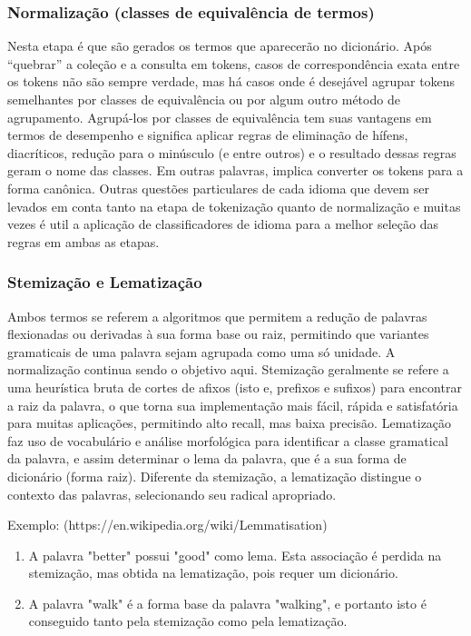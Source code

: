 \subsubsection{Normalização (classes de equivalência de termos)}
Nesta etapa é que são gerados os termos que aparecerão no dicionário.
Após “quebrar” a coleção e a consulta em tokens, casos de correspondência exata entre os tokens não são sempre verdade, mas há casos onde é desejável agrupar tokens semelhantes por classes de equivalência ou por algum outro método de agrupamento. Agrupá-los por classes de equivalência tem suas vantagens em termos de desempenho e significa aplicar regras de eliminação de hífens, diacríticos, redução para o minúsculo (e entre outros) e o resultado dessas regras geram o nome das classes. Em outras palavras, implica converter os tokens para a forma canônica. Outras questões particulares de cada idioma que devem ser levados em conta tanto na etapa de tokenização quanto de normalização e muitas vezes é util a aplicação de classificadores de idioma para a melhor seleção das regras em ambas as etapas.

\subsubsection{Stemização e Lematização}

Ambos termos se referem a algoritmos que permitem a redução de palavras flexionadas ou derivadas à sua forma base ou raiz, permitindo que variantes gramaticais de uma palavra sejam agrupada como uma só unidade. A normalização continua sendo o objetivo aqui.
Stemização geralmente se refere a uma heurística bruta de cortes de afixos (isto e, prefixos e sufixos) para encontrar a raiz da palavra, o que torna sua implementação mais fácil, rápida e satisfatória para muitas aplicações, permitindo alto recall, mas baixa precisão.
Lematização faz uso de vocabulário e análise morfológica para identificar a classe gramatical da palavra, e assim determinar o lema da palavra, que é a sua forma de dicionário (forma raiz). Diferente da stemização, a lematização distingue o contexto das palavras, selecionando seu radical apropriado.

Exemplo: (https://en.wikipedia.org/wiki/Lemmatisation)

\begin{enumerate}
\item A palavra "better" possui "good" como lema. Esta associação é perdida na stemização, mas obtida na lematização, pois requer um dicionário.

\item A palavra "walk" é a forma base da palavra "walking", e portanto isto é conseguido tanto pela stemização como pela lematização.
\end{enumerate}

